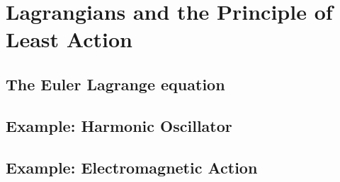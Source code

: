 \chapter{Lagrangians and the Principle of Least Action}

\section{The Euler Lagrange equation}

\section{Example: Harmonic Oscillator}

\section{Example: Electromagnetic Action}